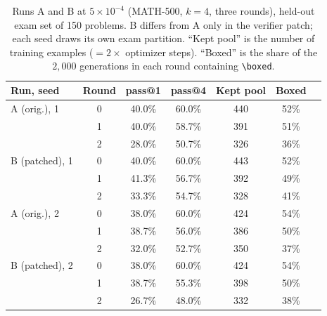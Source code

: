 \documentclass[runningheads]{llncs}
\begin{document}
\begin{table}[t]
\caption{Runs A and B at $5\times10^{-4}$ (MATH-500, $k=4$, three rounds),
held-out exam set of 150 problems. B differs from A only in the verifier patch;
each seed draws its own exam partition. ``Kept pool'' is the number of
training examples ($=2\times$ optimizer steps). ``Boxed'' is the share of the
$2{,}000$ generations in each round containing \texttt{\textbackslash boxed}.}
\label{tab:lrcheck}
\centering
\setlength{\tabcolsep}{6pt}
\begin{tabular}{lcccccc}
\toprule
Run, seed & Round & pass@1 & pass@4 & Kept pool & Boxed \\
\midrule
A (orig.), 1   & 0 & 40.0\% & 60.0\% & 440 & 52\% \\
               & 1 & 40.0\% & 58.7\% & 391 & 51\% \\
               & 2 & 28.0\% & 50.7\% & 326 & 36\% \\
B (patched), 1 & 0 & 40.0\% & 60.0\% & 443 & 52\% \\
               & 1 & 41.3\% & 56.7\% & 392 & 49\% \\
               & 2 & 33.3\% & 54.7\% & 328 & 41\% \\
\midrule
A (orig.), 2   & 0 & 38.0\% & 60.0\% & 424 & 54\% \\
               & 1 & 38.7\% & 56.0\% & 386 & 50\% \\
               & 2 & 32.0\% & 52.7\% & 350 & 37\% \\
B (patched), 2 & 0 & 38.0\% & 60.0\% & 424 & 54\% \\
               & 1 & 38.7\% & 55.3\% & 398 & 50\% \\
               & 2 & 26.7\% & 48.0\% & 332 & 38\% \\
\bottomrule
\end{tabular}
\end{table}
\end{document}
